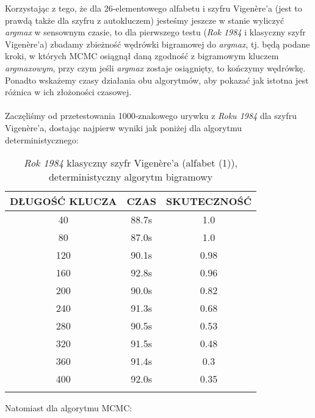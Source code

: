\documentclass[a4paper]{article}
\theoremstyle{defn}
\theoremstyle{theorem}
\theoremstyle{lemma}
\theoremstyle{cor}
\theoremstyle{fact}
\begin{document}
Korzystając z tego, że dla 26-elementowego alfabetu i szyfru Vigenère'a (jest to prawdą także dla szyfru z autokluczem) jesteśmy jeszcze w stanie wyliczyć \textit{argmax} w sensownym czasie, to dla pierwszego testu (\textit{Rok 1984} i klasyczny szyfr Vigenère'a) zbadamy zbieżność wędrówki bigramowej do \textit{argmax}, tj. będą podane kroki, w których MCMC osiągnął daną zgodność z bigramowym kluczem \textit{argmaxowym}, przy czym jeśli \textit{argmax} zostaje osiągnięty, to kończymy wędrówkę. Ponadto wskażemy czasy działania obu algorytmów, aby pokazać jak istotna jest różnica w ich złożoności czasowej.\\\\
Zaczęliśmy od przetestowania 1000-znakowego urywku z \textit{Roku 1984} dla szyfru Vigenère'a, dostając najpierw wyniki jak poniżej dla algorytmu deterministycznego:
\begin{center}\begin{longtable}{|c|c|c|} 
\hline DŁUGOŚĆ KLUCZA & CZAS & SKUTECZNOŚĆ \\ \hline 
40 & 88.7s & 1.0 \\ \hline 
80 & 87.0s & 1.0 \\ \hline 
120 & 90.1s & 0.98 \\ \hline 
160 & 92.8s & 0.96 \\ \hline 
200 & 90.0s & 0.82 \\ \hline 
240 & 91.3s & 0.68 \\ \hline 
280 & 90.5s & 0.53 \\ \hline 
320 & 91.5s & 0.48 \\ \hline 
360 & 91.4s & 0.3 \\ \hline 
400 & 92.0s & 0.35 \\ \hline 
\caption{\textit{Rok 1984} klasyczny szyfr Vigenère'a (alfabet (1)), deterministyczny algorytm bigramowy}
\end{longtable}\end{center} 
Natomiast dla algorytmu MCMC:
\end{document}
